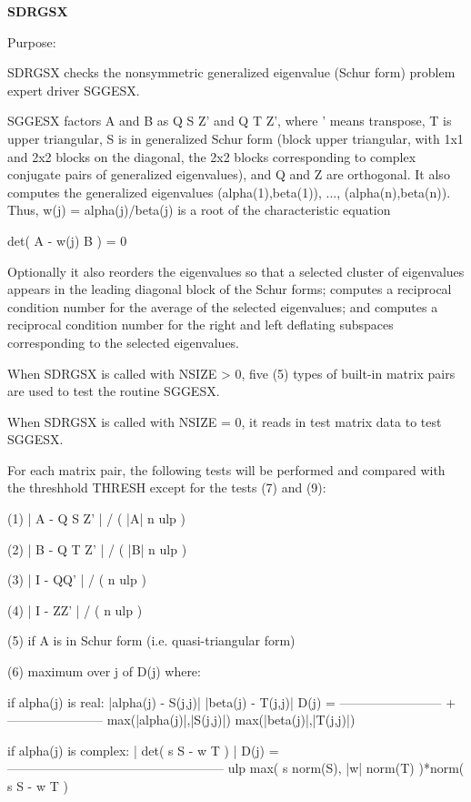 {\bfseries S\+D\+R\+G\+S\+X} 

\begin{DoxyParagraph}{Purpose\+: }
\begin{DoxyVerb} SDRGSX checks the nonsymmetric generalized eigenvalue (Schur form)
 problem expert driver SGGESX.

 SGGESX factors A and B as Q S Z' and Q T Z', where ' means
 transpose, T is upper triangular, S is in generalized Schur form
 (block upper triangular, with 1x1 and 2x2 blocks on the diagonal,
 the 2x2 blocks corresponding to complex conjugate pairs of
 generalized eigenvalues), and Q and Z are orthogonal.  It also
 computes the generalized eigenvalues (alpha(1),beta(1)), ...,
 (alpha(n),beta(n)). Thus, w(j) = alpha(j)/beta(j) is a root of the
 characteristic equation

     det( A - w(j) B ) = 0

 Optionally it also reorders the eigenvalues so that a selected
 cluster of eigenvalues appears in the leading diagonal block of the
 Schur forms; computes a reciprocal condition number for the average
 of the selected eigenvalues; and computes a reciprocal condition
 number for the right and left deflating subspaces corresponding to
 the selected eigenvalues.

 When SDRGSX is called with NSIZE > 0, five (5) types of built-in
 matrix pairs are used to test the routine SGGESX.

 When SDRGSX is called with NSIZE = 0, it reads in test matrix data
 to test SGGESX.

 For each matrix pair, the following tests will be performed and
 compared with the threshhold THRESH except for the tests (7) and (9):

 (1)   | A - Q S Z' | / ( |A| n ulp )

 (2)   | B - Q T Z' | / ( |B| n ulp )

 (3)   | I - QQ' | / ( n ulp )

 (4)   | I - ZZ' | / ( n ulp )

 (5)   if A is in Schur form (i.e. quasi-triangular form)

 (6)   maximum over j of D(j)  where:

       if alpha(j) is real:
                     |alpha(j) - S(j,j)|        |beta(j) - T(j,j)|
           D(j) = ------------------------ + -----------------------
                  max(|alpha(j)|,|S(j,j)|)   max(|beta(j)|,|T(j,j)|)

       if alpha(j) is complex:
                                 | det( s S - w T ) |
           D(j) = ---------------------------------------------------
                  ulp max( s norm(S), |w| norm(T) )*norm( s S - w T )


\end{DoxyVerb}
\end{DoxyParagraph}
